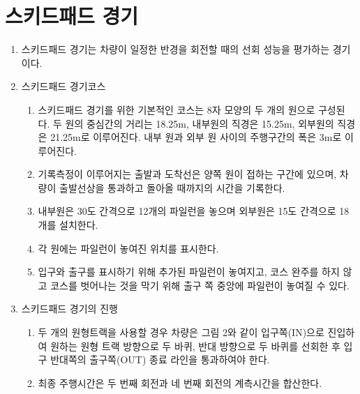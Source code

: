 \documentclass[final,a4paper,10pt]{report}
\begin{document}
\section{스키드패드 경기}\label{rule:formula-competition.skid-pad}
\begin{enumerate}
  \item\label{rule:formula-competition.skid-pad.fixed-radius-cornering-eval} 스키드패드 경기는 차량이 일정한 반경을 회전할 때의 선회 성능을 평가하는 경기이다.
  \item\label{rule:formula-competition.skid-pad.course} 스키드패드 경기코스
    \begin{enumerate}
      \item\label{rule:formula-competition.skid-pad.course.figure-eight-dimensions} 스키드패드 경기를 위한 기본적인 코스는 8자 모양의 두 개의 원으로 구성된다. 두 원의 중심간의 거리는 18.25m, 내부원의 직경은 15.25m, 외부원의 직경은 21.25m로 이루어진다. 내부 원과 외부 원 사이의 주행구간의 폭은 3m로 이루어진다.
      \item\label{rule:formula-competition.skid-pad.course.start-finish-line} 기록측정이 이루어지는 출발과 도착선은 양쪽 원이 접하는 구간에 있으며, 차량이 출발선상을 통과하고 돌아올 때까지의 시간을 기록한다.
      \item\label{rule:formula-competition.skid-pad.course.inner-outer-cone-count} 내부원은 30도 간격으로 12개의 파일런을 놓으며 외부원은 15도 간격으로 18개를 설치한다.
      \item\label{rule:formula-competition.skid-pad.course.cone-position-markings} 각 원에는 파일런이 놓여진 위치를 표시한다.
      \item\label{rule:formula-competition.skid-pad.course.entry-exit-cones} 입구와 출구를 표시하기 위해 추가된 파일런이 놓여지고, 코스 완주를 하지 않고 코스를 벗어나는 것을 막기 위해 출구 쪽 중앙에 파일런이 놓여질 수 있다.
    \end{enumerate}
  \item\label{rule:formula-competition.skid-pad.run-procedure} 스키드패드 경기의 진행
    \begin{enumerate}
      \item\label{rule:formula-competition.skid-pad.run-procedure.two-laps-each-direction} 두 개의 원형트랙을 사용할 경우 차량은 그림 2와 같이 입구쪽(IN)으로 진입하여 원하는 원형 트랙 방향으로 두 바퀴, 반대 방향으로 두 바퀴를 선회한 후 입구 반대쪽의 출구쪽(OUT) 종료 라인을 통과하여야 한다.
      \item\label{rule:formula-competition.skid-pad.run-procedure.combined-lap2-lap4-time} 최종 주행시간은 두 번째 회전과 네 번째 회전의 계측시간을 합산한다.

\end{enumerate}
\end{enumerate}
\end{document}
